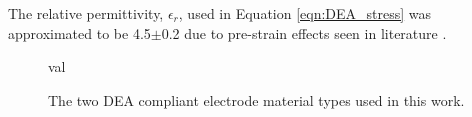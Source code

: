The relative permittivity, $\epsilon_r$, used in Equation \ref{eqn:DEA_stress} was approximated to be 4.5$\pm$0.2 due to pre-strain effects seen in literature \cite{Kofod2003, Choi2005, Wissler2007, Pan2015}.
\begin{figure}[H]
	\centering
 val	
	\hspace{1cm}
	\vspace{0.2cm}
	\caption{The two DEA compliant electrode material types used in this work.}
	\label{fig:DEAs}
\end{figure}

